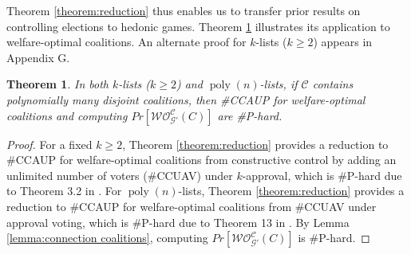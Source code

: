 \documentclass[letterpaper]{article}
\newtheorem{theorem}{Theorem}
\DeclareMathOperator*{\poly}{poly}
\begin{document}
Theorem \ref{theorem:reduction} thus enables us to transfer prior results on controlling elections to hedonic games. Theorem \ref{theorem:CCAUP-computationally-hard} illustrates its application to welfare-optimal coalitions. An alternate proof for $k$-lists ($k \geq 2$) appears in Appendix G. %
\begin{theorem}
\label{theorem:CCAUP-computationally-hard}
In both $k$-lists ($k \geq 2$) and $\poly(n)$-lists, if $\mathcal{C}$ contains polynomially many \textit{disjoint} coalitions, then \#CCAUP for welfare-optimal coalitions and computing $Pr[\mathcal{WO}^{\mathcal{C}}_{\mathcal{G}'}(C)]$ are \#P-hard. %
\end{theorem}
\begin{proof}
For a fixed $k \geq 2$, Theorem \ref{theorem:reduction} provides a reduction to \#CCAUP for welfare-optimal coalitions from constructive control by adding an unlimited number of voters (\#CCUAV) under $k$-approval, which is \#P-hard due to Theorem 3.2 in \cite{imber2021probabilistic}. For $\poly(n)$-lists, Theorem \ref{theorem:reduction} provides a reduction to \#CCAUP for welfare-optimal coalitions from \#CCUAV under approval voting, which is \#P-hard due to Theorem 13 in \cite{wojtas2012possible}. %
By Lemma \ref{lemma:connection coalitions}, computing $Pr[\mathcal{WO}^{\mathcal{C}}_{\mathcal{G}'}(C)]$ is \#P-hard.
\end{proof}
\end{document}
